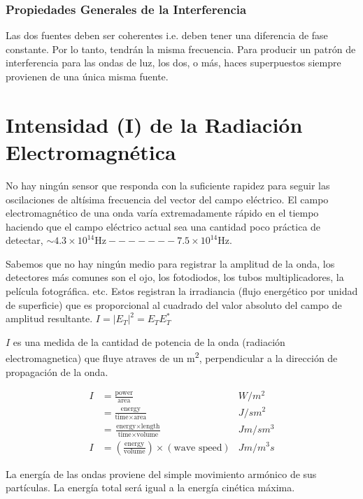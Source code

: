 \documentclass[12pt]{article}
\begin{document}
	\subsubsection*{Propiedades Generales de la Interferencia}
	Las dos fuentes deben ser coherentes i.e. deben tener una diferencia de fase constante. Por lo tanto, tendrán la misma frecuencia. Para producir un patrón de interferencia para las ondas de luz, los dos, o más, haces superpuestos siempre provienen de una única misma fuente.
	
	\section{Intensidad (I) de la Radiación Electromagnética}
	No hay ningún sensor que responda con la suficiente rapidez para seguir las oscilaciones de altísima frecuencia del vector del campo eléctrico. El campo electromagnético de una onda varía extremadamente rápido en el tiempo haciendo que el campo eléctrico actual sea una cantidad poco práctica de detectar, $\sim 4.3 \times 10^{14} \text{Hz} ------- 7.5 \times 10^{14} \text{Hz}$.
	
	Sabemos que no hay ningún medio para registrar la amplitud de la onda, los detectores más comunes son el ojo, los fotodiodos, los tubos multiplicadores, la película fotográfica. etc. Estos registran la irradiancia (flujo energético por unidad de superficie) que es proporcional al cuadrado del valor absoluto del campo de amplitud resultante. $I = |E_T|^2 = E_T E_T^*$
	
	$I$ es una medida de la cantidad de potencia de la onda (radiación electromagnetica) que fluye atraves de un m\textsuperscript{2}, perpendicular a la dirección de propagación de la onda.
	
	\begin{align*}
		I &= \frac{\text{power}}{\text{area}} & W/m^2 \\
		&= \frac{\text{energy}}{\text{time} \times \text{area}} & J/sm^2 \\
		&= \frac{\text{energy} \times \text{length}}{\text{time} \times \text{volume}} & Jm/sm^3 \\
		I &= \left(\frac{\text{energy}}{\text{volume}}\right) \times (\text{wave speed}) & Jm/m^3 s
	\end{align*}
	
	La energía de las ondas proviene del simple movimiento armónico de sus partículas. La energía total será igual a la energía cinética máxima.
	
\end{document}
